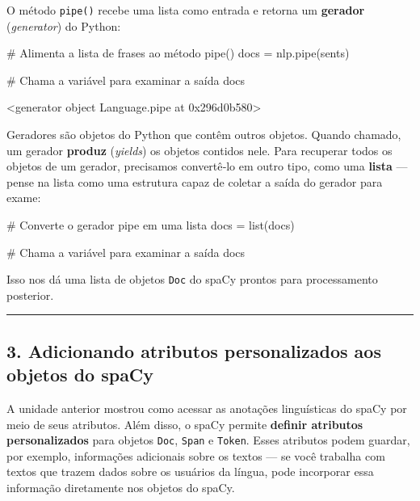 \documentclass[
  brazilian,
  11pt,
]{article}
\newenvironment{Shaded}{\begin{snugshade}}{\end{snugshade}}
\newcommand{\BuiltInTok}[1]{\textcolor[rgb]{0.50,0.55,0.55}{#1}}
\newcommand{\CommentTok}[1]{\textcolor[rgb]{0.48,0.49,0.49}{#1}}
\newcommand{\NormalTok}[1]{\textcolor[rgb]{0.81,0.81,0.76}{#1}}
\newcommand{\OperatorTok}[1]{\textcolor[rgb]{0.81,0.81,0.76}{#1}}
\let\oldtexttt\texttt
\renewcommand{\texttt}[1]{{\color{inlink}\oldtexttt{#1}}}
\begin{document}
O método \texttt{pipe()} recebe uma lista como entrada e retorna um
\textbf{gerador} (\emph{generator}) do Python:

\begin{Shaded}
\begin{Highlighting}[]
\CommentTok{\# Alimenta a lista de frases ao método pipe()}
\NormalTok{docs }\OperatorTok{=}\NormalTok{ nlp.pipe(sents)}

\CommentTok{\# Chama a variável para examinar a saída}
\NormalTok{docs}
\end{Highlighting}
\end{Shaded}

\begin{Shaded}
\begin{Highlighting}[]
\NormalTok{\textless{}generator object Language.pipe at 0x296d0b580\textgreater{}}
\end{Highlighting}
\end{Shaded}

Geradores são objetos do Python que contêm outros objetos. Quando
chamado, um gerador \textbf{produz} (\emph{yields}) os objetos contidos
nele. Para recuperar todos os objetos de um gerador, precisamos
convertê‑lo em outro tipo, como uma \textbf{lista} --- pense na lista
como uma estrutura capaz de coletar a saída do gerador para exame:

\begin{Shaded}
\begin{Highlighting}[]
\CommentTok{\# Converte o gerador pipe em uma lista}
\NormalTok{docs }\OperatorTok{=} \BuiltInTok{list}\NormalTok{(docs)}

\CommentTok{\# Chama a variável para examinar a saída}
\NormalTok{docs}
\end{Highlighting}
\end{Shaded}

Isso nos dá uma lista de objetos \texttt{Doc} do spaCy prontos para
processamento posterior.

\begin{center}\rule{0.5\linewidth}{0.5pt}\end{center}

\subsection{3. Adicionando atributos personalizados aos objetos do
spaCy}\label{adicionando-atributos-personalizados-aos-objetos-do-spacy}

A unidade anterior mostrou como acessar as anotações linguísticas do
spaCy por meio de seus atributos. Além disso, o spaCy permite
\textbf{definir atributos personalizados} para objetos \texttt{Doc},
\texttt{Span} e \texttt{Token}. Esses atributos podem guardar, por
exemplo, informações adicionais sobre os textos --- se você trabalha com
textos que trazem dados sobre os usuários da língua, pode incorporar
essa informação diretamente nos objetos do spaCy.
\end{document}
